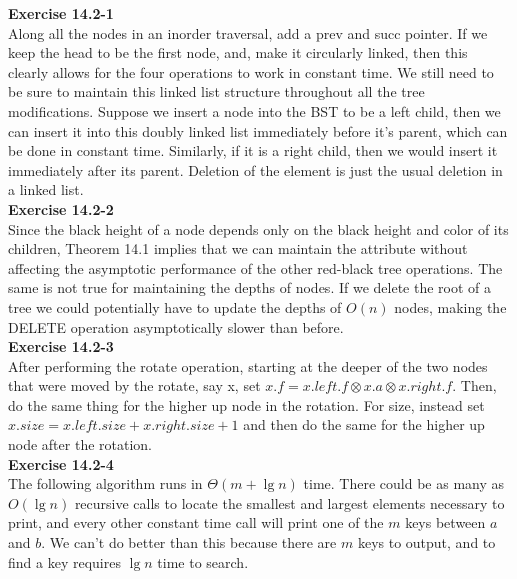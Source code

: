 \documentclass{article}
\begin{document}
\noindent\textbf{ Exercise 14.2-1} \\

Along all the nodes in an inorder traversal, add a prev and succ pointer. If we keep the head to be the first node, and, make it circularly linked, then this clearly allows for the four operations to work in constant time. We still need to be sure to maintain this linked list structure throughout all the tree modifications. Suppose we insert a node into the BST to be a left child, then we can insert it into this doubly linked list immediately before it's parent, which can be done in constant time. Similarly, if it is a right child, then we would insert it immediately after its parent. Deletion of the element is just the usual deletion in a linked list.\\

\noindent\textbf{Exercise 14.2-2}\\

Since the black height of a node depends only on the black height and color of its children, Theorem 14.1 implies that we can maintain the attribute without affecting the asymptotic performance of the other red-black tree operations.  The same is not true for maintaining the depths of nodes.  If we delete the root of a tree we could potentially have to update the depths of $O(n)$ nodes, making the DELETE operation asymptotically slower than before. \\

\noindent\textbf{ Exercise 14.2-3} \\

After performing the rotate operation, starting at the deeper of the two nodes that were moved by the rotate, say x, set $x.f  = x.left.f \otimes x.a \otimes x.right.f$. Then, do the same thing for the higher up node in the rotation. For size, instead set $x.size = x.left.size+ x.right.size + 1$ and then do the same for the higher up node after the rotation.\\

\noindent\textbf{Exercise 14.2-4}\\

The following algorithm runs in $\Theta(m+\lg n)$ time.  There could be as many as $O(\lg n)$ recursive calls to locate the smallest and largest elements necessary to print, and every other constant time call will print one of the $m$ keys between $a$ and $b$.  We can't do better than this because there are $m$ keys to output, and to find a key requires $\lg n$ time to search.
\end{document}
